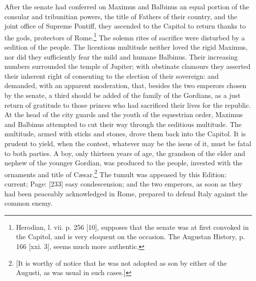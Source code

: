 After the senate had conferred on Maximus and Balbinus an equal portion of the consular and tribunitian powers, the title of Fathers of their country, and the joint office of Supreme Pontiff, they ascended to the Capitol to return thanks to the gods, protectors of Rome.\footnote{Herodian, l. vii. p. 256 [10], supposes that the senate was at first convoked in the Capitol, and is very eloquent on the occasion. The Augustan History, p. 166 [xxi. 3], seems much more authentic.} The solemn rites of sacrifice were disturbed by a sedition of the people. The licentious multitude neither loved the rigid Maximus, nor did they sufficiently fear the mild and humane Balbinus. Their increasing numbers surrounded the temple of Jupiter; with obstinate clamours they asserted their inherent right of consenting to the election of their sovereign: and demanded, with an apparent moderation, that, besides the two emperors chosen by the senate, a third should be added of the family of the Gordians, as a just return of gratitude to those princes who had sacrificed their lives for the republic. At the head of the city guards and the youth of the equestrian order, Maximus and Balbinus attempted to cut their way through the seditious multitude. The multitude, armed with sticks and stones, drove them back into the Capitol. It is prudent to yield, when the contest, whatever may be the issue of it, must be fatal to both parties. A boy, only thirteen years of age, the grandson of the elder and nephew of the younger Gordian, was produced to the people, invested with the ornaments and title of Cæsar.\footnote{[It is worthy of notice that he was not adopted as son by either of the Augusti, as was usual in such cases.]} The tumult was appeased by this Edition: current; Page: [233] easy condescension; and the two emperors, as soon as they had been peaceably acknowledged in Rome, prepared to defend Italy against the common enemy.

